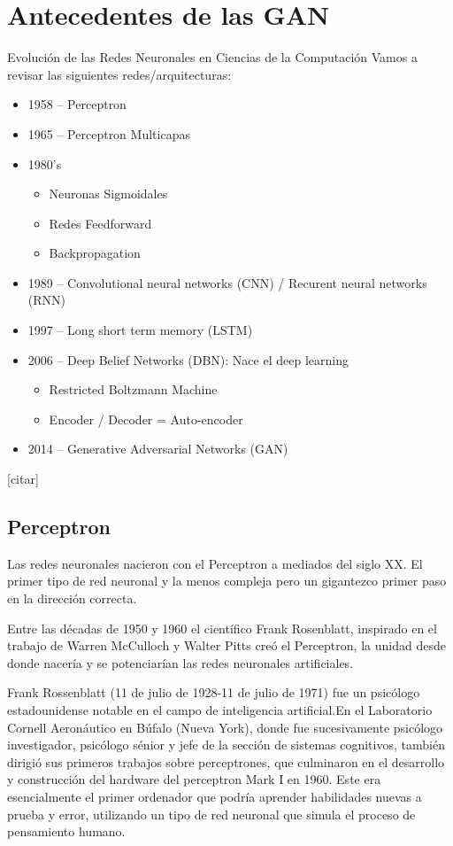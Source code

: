 \documentclass[a4paper]{article}
\begin{document}
\section{Antecedentes de las GAN}
Evolución de las Redes Neuronales en Ciencias de la Computación
Vamos a revisar las siguientes redes/arquitecturas:
\begin{itemize}

    \item{1958 – Perceptron}
    \item{1965 – Perceptron Multicapas}
    \item{1980’s
    	\begin{itemize}
    	\item{Neuronas Sigmoidales}
        \item{Redes Feedforward}
        \item{Backpropagation}
        \end{itemize}
        }
    \item{1989 – Convolutional neural networks (CNN) / Recurent neural networks (RNN)}
    \item{1997 – Long short term memory (LSTM)}
    \item{2006 – Deep Belief Networks (DBN): Nace el deep learning}
    \begin{itemize}
    
        \item{Restricted Boltzmann Machine}
        \item{Encoder / Decoder = Auto-encoder}
        
    \end{itemize}
    \item{2014 – Generative Adversarial Networks (GAN)}

\end{itemize}[citar]


\subsection{Perceptron}
Las redes neuronales nacieron con el Perceptron a mediados del siglo XX. El primer tipo de red neuronal y la menos compleja pero un gigantezco primer paso en la dirección correcta.

Entre las décadas de 1950 y 1960 el científico Frank Rosenblatt, inspirado en el trabajo de Warren McCulloch y Walter Pitts creó el Perceptron, la unidad desde donde nacería y se potenciarían las redes neuronales artificiales.

Frank Rossenblatt (11 de julio de 1928-11 de julio de 1971) fue un
psicólogo estadounidense notable en el campo de inteligencia
artificial.En el Laboratorio Cornell Aeronáutico en Búfalo (Nueva
York), donde fue sucesivamente psicólogo investigador, psicólogo
sénior y jefe de la sección de sistemas cognitivos,
también dirigió sus primeros trabajos 
sobre perceptrones, que culminaron en el desarrollo
 y construcción del hardware del 
 perceptron Mark I en
1960.
Este era esencialmente el primer ordenador que podría aprender habilidades nuevas a prueba y error, utilizando un tipo de red neuronal que simula el proceso de pensamiento humano. 
\end{document}
